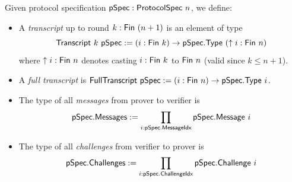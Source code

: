 \begin{definition}
    \label{def:transcript}
        Given protocol specification \(\mathsf{pSpec} : \mathsf{ProtocolSpec}\ n\), we define:
    \begin{itemize}
        \item A \emph{transcript} up to round \(k : \mathsf{Fin}\ (n + 1)\) is an element of type
                \begin{equation*} \mathsf{Transcript}\ k\ \mathsf{pSpec} := (i : \mathsf{Fin}\ k) \to \mathsf{pSpec}.\mathsf{Type}\ (\uparrow i : \mathsf{Fin}\ n) \end{equation*}
        where \(\uparrow i : \mathsf{Fin}\ n\) denotes casting \(i : \mathsf{Fin}\ k\) to \(\mathsf{Fin}\ n\) (valid since \(k \leq n + 1\)).

        \item A \emph{full transcript} is \(\mathsf{FullTranscript}\ \mathsf{pSpec} := (i : \mathsf{Fin}\ n) \to \mathsf{pSpec}.\mathsf{Type}\ i\).

        \item The type of all \emph{messages} from prover to verifier is
        \begin{equation*} \mathsf{pSpec}.\mathsf{Messages} := \prod_{i : \mathsf{pSpec}.\mathsf{MessageIdx}} \mathsf{pSpec}.\mathsf{Message}\ i \end{equation*}

        \item The type of all \emph{challenges} from verifier to prover is
        \begin{equation*} \mathsf{pSpec}.\mathsf{Challenges} := \prod_{i : \mathsf{pSpec}.\mathsf{ChallengeIdx}} \mathsf{pSpec}.\mathsf{Challenge}\ i \end{equation*}
    \end{itemize}
    \leanok
\end{definition}


